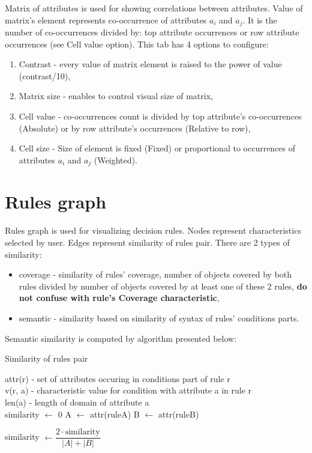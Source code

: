 \documentclass[12pt]{article}
\newlength\mylen
\newcommand\myinput[1]{%
  \settowidth\mylen{\KwIn{}}%
  \setlength\hangindent{\mylen}%
  \hspace*{\mylen}#1\\}
\begin{document}
Matrix of attributes is used for showing correlations between attributes. Value of matrix's element represents co-occurrence of attributes $a_i$ and $a_j$. It is the number of co-occurrences divided by: top attribute occurrences or row attribute occurrences (see Cell value option). This tab has 4 options to configure:
\begin{enumerate}
    \setlength\itemsep{0em}
    \item Contrast - every value of matrix element is raised to the power of value (contrast/10),
    \item Matrix size - enables to control visual size of matrix,
    \item Cell value - co-occurrences count is divided by top attribute's co-occurrences (Absolute) or by row attribute's occurrences (Relative to row),
    \item Cell size - Size of element is fixed (Fixed) or proportional to occurrences of attributes $a_i$ and $a_j$ (Weighted).
\end{enumerate}

\section{Rules graph}

Rules graph is used for visualizing decision rules. Nodes represent characteristics selected by user. Edges represent similarity of rules pair. There are 2 types of similarity:
\begin{itemize}
    \setlength\itemsep{0em}
    \item coverage - similarity of rules' coverage, number of objects covered by both rules divided by number of objects covered by at least one of these 2 rules, \textbf{do not confuse with rule's Coverage characteristic},
    \item semantic - similarity based on similarity of syntax of rules' conditions parts.
\end{itemize}

Semantic similarity is computed by algorithm presented below:

\begin{algorithm}[H]
    \caption{Similarity of rules pair}
    \myinput{attr(r) - set of attributes occuring in conditions part of rule r}
    \myinput{v(r, a) - characteristic value for condition with attribute a in rule r}
    \myinput{len(a) - length of domain of attribute a}
    \BlankLine
    similarity $\gets$ 0\;
    A $\gets$ attr(ruleA)\;
    B $\gets$ attr(ruleB)\;
    
    similarity $\gets \dfrac{2 \cdot \text{similarity}}{ |A| + |B|}$ \;
\end{algorithm}
\end{document}
